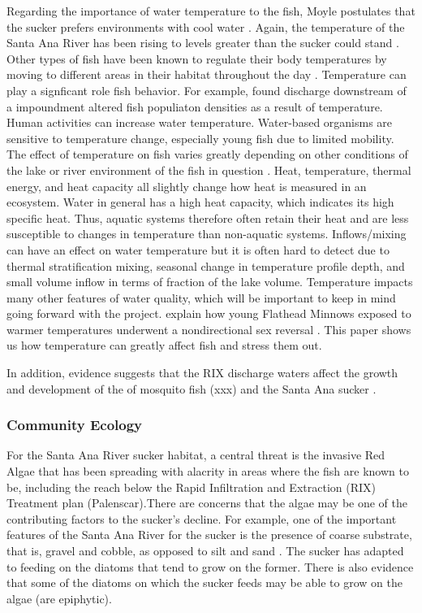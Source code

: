 \documentclass{article}\usepackage[]{graphicx}\usepackage[]{color}
\begin{document}
Regarding the importance of water temperature to the fish, Moyle postulates that the sucker prefers environments with cool water \citep{moyle2002inland}. Again, the temperature of the Santa Ana River has been rising to levels greater than the sucker could stand \citep{REF}. Other types of fish have been known to regulate their body temperatures by moving to different areas in their habitat throughout the day \citep{matthews1994cool}. Temperature can play a signficant role fish behavior. For example, \citet{sadler1980effect} found discharge downstream of a impoundment altered fish populiaton densities as a result of temperature. Human activities can increase water temperature. Water-based organisms are sensitive to temperature change, especially young fish due to limited mobility. The effect of temperature on fish varies greatly depending on other conditions of the lake or river environment of the fish in question \citep{loshuertos16}. Heat, temperature, thermal energy, and heat capacity all slightly change how heat is measured in an ecosystem. Water in general has a high heat capacity, which indicates its high specific heat. Thus, aquatic systems therefore often retain their heat and are less susceptible to changes in temperature than non-aquatic systems. Inflows/mixing can have an effect on water temperature but it is often hard to detect due to thermal stratification mixing, seasonal change in temperature profile depth, and small volume inflow in terms of fraction of the lake volume. Temperature impacts many other features of water quality, which will be important to keep in mind going forward with the project. \citet{coulter2015fluctuating} explain how young Flathead Minnows exposed to warmer temperatures underwent a nondirectional sex reversal . This paper shows us how temperature can greatly affect fish and stress them out. 

In addition, evidence suggests that the RIX discharge waters affect the growth and development of the of mosquito fish (xxx) and the Santa Ana sucker \citep{jenkins2009effects}.

\subsubsection{Community Ecology}

For the Santa Ana River sucker habitat, a central threat is the invasive Red Algae that has been spreading with alacrity in areas where the fish are known to be, including the reach below the Rapid Infiltration and Extraction (RIX) Treatment plan (Palenscar).There are concerns that the algae may be one of the contributing factors to the sucker's decline. For example, one of the important features of the Santa Ana River for the sucker is the presence of coarse substrate, that is, gravel and cobble, as opposed to silt and sand \citep{thompson2010influence}. The sucker has adapted to feeding on the diatoms that tend to grow on the former. There is also evidence that some of the diatoms on which the sucker feeds may be able to grow on the algae (are epiphytic). 
\end{document}
